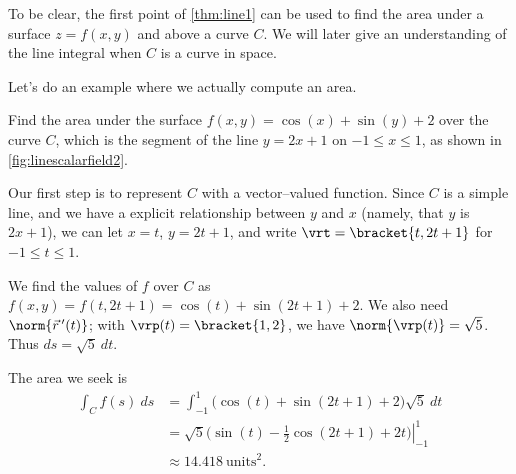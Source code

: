 To be clear, the first point of \autoref{thm:line1} can be used to find the area under a surface $z=f(x,y)$ and above a curve $C$. We will later give an understanding of the line integral when $C$ is a curve in space.


Let's do an example where we actually compute an area.


{Find the area under the surface $f(x,y) =\cos(x)+\sin(y)+2$ over the curve $C$, which is the segment of the line $y=2x+1$ on $-1\leq x\leq 1$, as shown in \autoref{fig:linescalarfield2}.}
{Our first step is to represent $C$ with a vector--valued function. Since $C$ is a simple line, and we have a explicit relationship between $y$ and $x$ (namely, that $y$ is $2x+1$), we can let $x = t$, $y = 2t+1$, and write $\vrt =\bracket{t,2t+1}$ for $-1\leq t\leq 1$. 

We find the values of $f$ over $C$ as $f(x,y) = f(t,2t+1) = \cos(t)+\sin(2t+1) + 2$. We also need $\norm{\vec r\,'(t)}$; with $\vrp(t) =\bracket{1,2}$, we have $\norm{\vrp(t)} = \sqrt{5}$. Thus $ds = \sqrt{5}\ dt$. 

The area we seek is 
\begin{align*}
	\int_Cf(s)\ ds
	&= \int_{-1}^1 \big(\cos(t)+\sin(2t+1) + 2\big)\sqrt{5}\ dt \\
	&= \left.\sqrt{5}\big(\sin(t) - \frac12\cos(2t+1)+2t\big)\right|_{-1}^1\\
	&\approx 14.418\ \text{units}^2.
\end{align*}}

